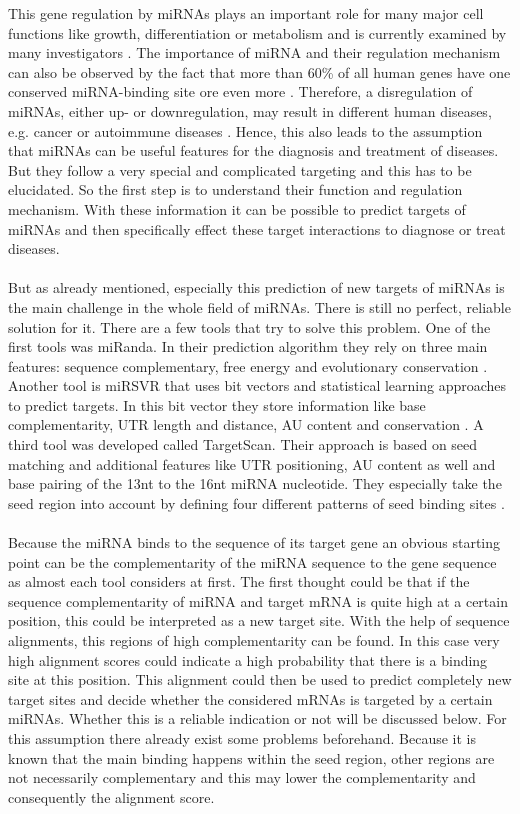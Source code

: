 \documentclass[12pt]{article}
\begin{document}
This gene regulation by miRNAs plays an important role for many major cell functions like growth, differentiation or metabolism and is currently examined by many investigators \cite{Ardekani}. The importance of miRNA and their regulation mechanism can also be observed by the fact that more than 60\% of all human genes have one conserved miRNA-binding site ore even more \cite{Friedman}. Therefore, a disregulation of miRNAs, either up- or downregulation, may result in different human diseases, e.g. cancer or autoimmune diseases \cite{Ardekani}. Hence, this also leads to the assumption that miRNAs can be useful features for the diagnosis and treatment of diseases. But they follow a very special and complicated targeting and this has to be elucidated. So the first step is to understand their function and regulation mechanism. With these information it can be possible to predict targets of miRNAs and then specifically effect these target interactions to diagnose or treat diseases. \\\\
But as already mentioned, especially this prediction of new targets of miRNAs is the main challenge in the whole field of miRNAs. There is still no perfect, reliable solution for it. There are a few tools that try to solve this problem. One of the first tools was miRanda. In their prediction algorithm they rely on three main features: sequence complementary, free energy and evolutionary conservation \cite{Enright}. Another tool is miRSVR that uses bit vectors and statistical learning approaches to predict targets. In this bit vector they store information like base complementarity, UTR length and distance, AU content and conservation \cite{Betel}. A third tool was developed called TargetScan. Their approach is based on seed matching and additional features like UTR positioning, AU content as well and base pairing of the 13nt to the 16nt miRNA nucleotide. They especially take the seed region into account by defining four different patterns of seed binding sites \cite{Lewis}.\\\\
Because the miRNA binds to the sequence of its target gene an obvious starting point can be the complementarity of the miRNA sequence to the gene sequence as almost each tool considers at first. The first thought could be that if the sequence complementarity of miRNA and target mRNA is quite high at a certain position, this could be interpreted as a new target site. With the help of sequence alignments, this regions of high complementarity can be found. In this case very high alignment scores could indicate a high probability that there is a binding site at this position. This alignment could then be used to predict completely new target sites and decide whether the considered mRNAs is targeted by a certain miRNAs. Whether this is a reliable indication or not will be discussed below. For this assumption there already exist some problems beforehand. Because it is known that the main binding happens within the seed region, other regions are not necessarily complementary and this may lower the complementarity and consequently the alignment score. \\\\
\end{document}
